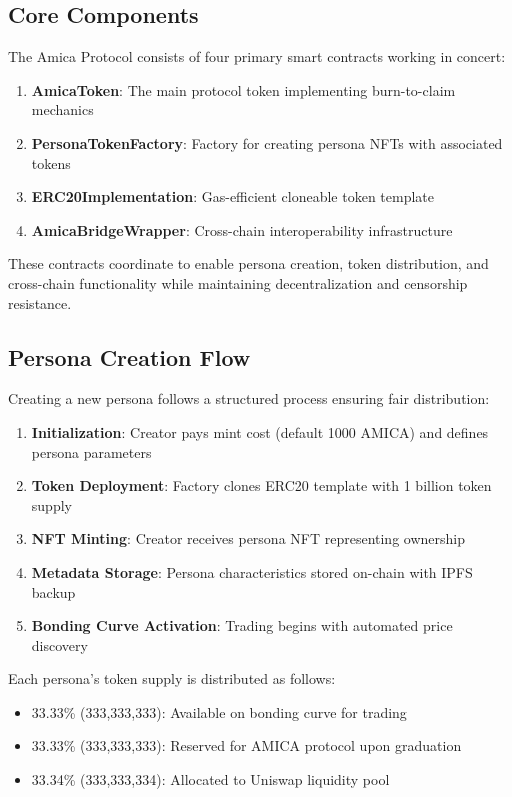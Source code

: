 \documentclass{article}
\begin{document}
\subsection{Core Components}

The Amica Protocol consists of four primary smart contracts working in concert:

\begin{enumerate}
    \item \textbf{AmicaToken}: The main protocol token implementing burn-to-claim mechanics
    \item \textbf{PersonaTokenFactory}: Factory for creating persona NFTs with associated tokens
    \item \textbf{ERC20Implementation}: Gas-efficient cloneable token template
    \item \textbf{AmicaBridgeWrapper}: Cross-chain interoperability infrastructure
\end{enumerate}

These contracts coordinate to enable persona creation, token distribution, and cross-chain functionality while maintaining decentralization and censorship resistance.

\subsection{Persona Creation Flow}

Creating a new persona follows a structured process ensuring fair distribution:

\begin{enumerate}
    \item \textbf{Initialization}: Creator pays mint cost (default 1000 AMICA) and defines persona parameters
    \item \textbf{Token Deployment}: Factory clones ERC20 template with 1 billion token supply
    \item \textbf{NFT Minting}: Creator receives persona NFT representing ownership
    \item \textbf{Metadata Storage}: Persona characteristics stored on-chain with IPFS backup
    \item \textbf{Bonding Curve Activation}: Trading begins with automated price discovery
\end{enumerate}

Each persona's token supply is distributed as follows:
\begin{itemize}
    \item 33.33\% (333,333,333): Available on bonding curve for trading
    \item 33.33\% (333,333,333): Reserved for AMICA protocol upon graduation
    \item 33.34\% (333,333,334): Allocated to Uniswap liquidity pool
\end{itemize}
\end{document}
